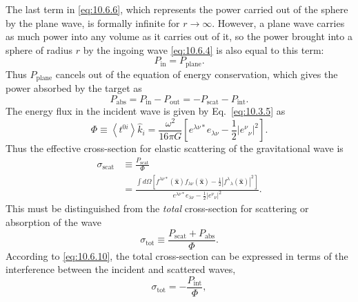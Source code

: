 The last term in \eqref{eq:10.6.6}, which represents the power carried out
of the sphere by the plane wave, is formally infinite for \(r\to\infty\).
However, a plane wave carries as much power into any volume as it carries out
of it, so the power brought into a sphere of radius \(r\) by the ingoing wave
\eqref{eq:10.6.4} is also equal to this term:
\begin{equation}
  P_{\mathrm{in}}=P_{\mathrm{plane}}.
  \tag{10.6.9}\label{eq:10.6.9}
\end{equation}
Thus \(P_{\mathrm{plane}}\) cancels out of the equation of energy conservation,
which gives the power absorbed by the target as
\begin{equation}
  P_{\mathrm{abs}}
  =
  P_{\mathrm{in}}-P_{\mathrm{out}}
  =
  -P_{\mathrm{scat}}-P_{\mathrm{int}}.
  \tag{10.6.10}\label{eq:10.6.10}
\end{equation}
The energy flux in the incident wave is given by Eq.~\eqref{eq:10.3.5} as
\begin{equation}
  \Phi
  \equiv
  \left\langle t^{0i}\right\rangle\widehat k_i
  =
  \frac{\omega^2}{16\pi G}
  \left[
    e^{\lambda\nu*}e_{\lambda\nu}
    -\frac12\left|e^\nu{}_\nu\right|^2
  \right].
  \tag{10.6.11}\label{eq:10.6.11}
\end{equation}
Thus the effective cross-section for elastic scattering of the gravitational
wave is
\begin{equation}
  \begin{split}
  \sigma_{\mathrm{scat}}
  &\equiv\frac{P_{\mathrm{scat}}}{\Phi}\\
  &=
  \frac{
    \displaystyle\int d\Omega
    \left[
      f^{\lambda\nu*}(\widehat{\mathbf{x}})
      f_{\lambda\nu}(\widehat{\mathbf{x}})
      -\frac12
      \left|f^\lambda{}_\lambda(\widehat{\mathbf{x}})\right|^2
    \right]
  }{
    \displaystyle
    e^{\lambda\nu*}e_{\lambda\nu}
    -\frac12\left|e^\nu{}_\nu\right|^2
  }.
  \end{split}
  \tag{10.6.12}\label{eq:10.6.12}
\end{equation}
This must be distinguished from the \emph{total} cross-section for scattering
or absorption of the wave
\begin{equation}
  \sigma_{\mathrm{tot}}
  \equiv
  \frac{P_{\mathrm{scat}}+P_{\mathrm{abs}}}{\Phi}.
  \tag{10.6.13}\label{eq:10.6.13}
\end{equation}
According to \eqref{eq:10.6.10}, the total cross-section can be expressed in
terms of the interference between the incident and scattered waves,
\begin{equation}
  \sigma_{\mathrm{tot}}=-\frac{P_{\mathrm{int}}}{\Phi},
  \tag{10.6.14}\label{eq:10.6.14}
\end{equation}
